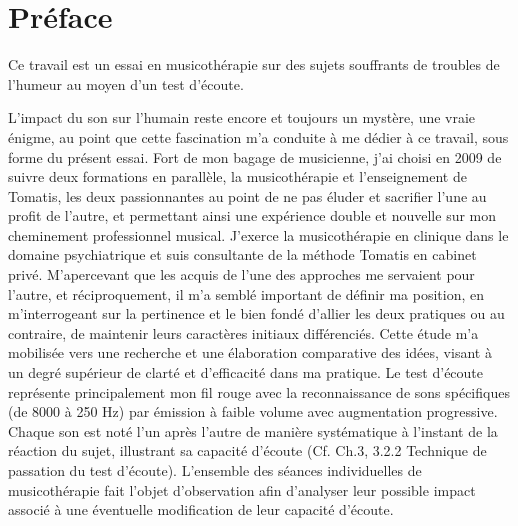 \chapter*{Préface}
Ce travail est un essai  en musicothérapie sur des sujets souffrants de troubles de 
l'humeur au moyen d'un test d'écoute. 

 L'impact du son sur l'humain reste encore et toujours un mystère, une vraie énigme, au point que cette  
 fascination %
 m'a conduite à me dédier à ce travail, sous forme du 
 présent essai.
 Fort de mon bagage de musicienne, j'ai choisi en 2009  de suivre deux formations en parallèle,  
 la musicothérapie et l'enseignement de  Tomatis, les deux passionnantes au point de ne pas éluder et 
 sacrifier l'une au profit de l'autre, et permettant ainsi une expérience double et nouvelle sur mon 
 cheminement professionnel musical.
 J'exerce  la musicothérapie en clinique dans le domaine psychiatrique et suis consultante de la 
 méthode 
 Tomatis en cabinet privé. M'apercevant que les 
 acquis de l'une des approches me servaient  pour l'autre, et réciproquement,
 il m'a semblé important de définir ma position, en  m'interrogeant  sur la pertinence et le bien fondé 
 d'allier les deux pratiques 
 ou au contraire, de maintenir  leurs caractères initiaux différenciés.  Cette étude m'a mobilisée vers une 
 recherche et une élaboration comparative  des idées, visant à un degré supérieur de clarté et d'efficacité 
 dans ma pratique.
 Le test d'écoute représente principalement mon fil rouge avec la  reconnaissance de sons 
 spécifiques (de 8000 à 250 Hz) par émission à faible volume avec augmentation progressive.
 Chaque son est noté l'un après l'autre de manière systématique à l'instant de la réaction du sujet,
  illustrant  sa capacité d'écoute (Cf. Ch.3, 3.2.2 Technique de 
 passation du test d'écoute). 
 L'ensemble des séances individuelles de musicothérapie fait  l'objet d'observation afin d'analyser 
 leur possible impact associé à une éventuelle modification de leur capacité d'écoute.

